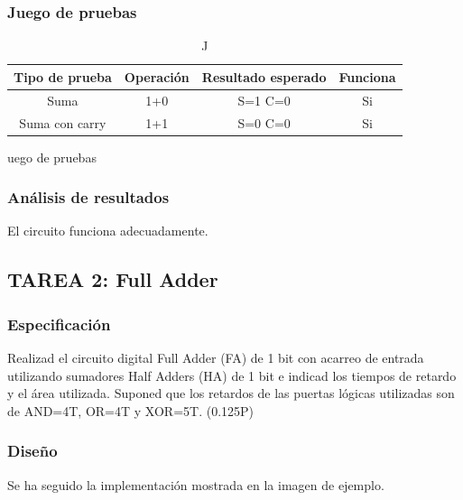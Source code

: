 \documentclass{article}
\begin{document}
		\subsubsection*{Juego de pruebas}
		
		\begin{table}[ht]
			\begin{center}
				\begin{tabular}{| c | c | c | c |}
					\hline
					Tipo de prueba & Operación & Resultado esperado & Funciona \\ \hline
					
					Suma & 1+0 & S=1 C=0 & Si \\ \hline
					Suma con carry & 1+1 & S=0 C=0 & Si \\ \hline
				\end{tabular}
				\caption Juego de pruebas
			\end{center}
		\end{table}

		\subsubsection*{Análisis de resultados}
		El circuito funciona adecuadamente.


	\subsection{TAREA 2: Full Adder}
		\subsubsection*{Especificación}
		Realizad el circuito digital Full Adder (FA) de 1 bit con acarreo de entrada utilizando
		sumadores Half Adders (HA) de 1 bit e indicad los tiempos de retardo y el área utilizada. Suponed
		que los retardos de las puertas lógicas utilizadas son de AND=4T, OR=4T y XOR=5T. (0.125P)

		\subsubsection*{Diseño}
		Se ha seguido la implementación mostrada en la imagen de ejemplo.
\end{document}
